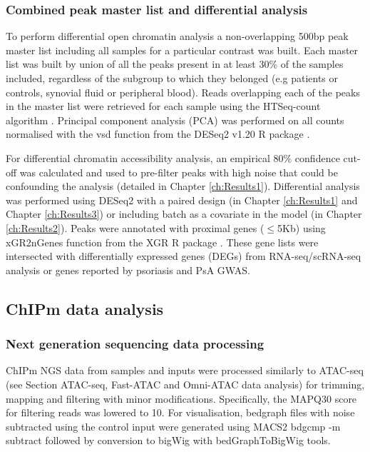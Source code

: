 \subsubsection{Combined peak master list and differential analysis}
To perform differential open chromatin analysis a non-overlapping 500bp peak master list including all samples for a particular contrast was built. Each master list was built by union of all the peaks present in at least 30\% of the samples included, regardless of the subgroup to which they belonged (e.g patients or controls, synovial fluid or peripheral blood).  Reads overlapping each of the peaks in the master list were retrieved for each sample using the HTSeq-count algorithm \parencite{Anders2015}. Principal component analysis (PCA) was performed on all counts normalised with the vsd function from the DESeq2 v1.20 R package \parencite{Love2014}.

For differential chromatin accessibility analysis, an empirical 80\% confidence cut-off was calculated and used to pre-filter peaks with high noise that could be confounding the analysis (detailed in Chapter \ref{ch:Results1}). Differential analysis was performed using DESeq2 with a paired design (in Chapter \ref{ch:Results1} and Chapter \ref{ch:Results3}) or including batch as a covariate in the model (in Chapter \ref{ch:Results2}). Peaks were annotated with proximal genes ($\leq$5Kb) using xGR2nGenes function from the XGR R package \parencite{Fang2016}. These gene lists were intersected with differentially expressed genes (DEGs) from RNA-seq/scRNA-seq analysis or genes reported by psoriasis and PsA GWAS.





\subsection{ChIPm data analysis}

\subsubsection{Next generation sequencing data processing}
ChIPm NGS data from samples and inputs were processed similarly to ATAC-seq (see Section ATAC-seq, Fast-ATAC and Omni-ATAC data analysis) for trimming, mapping and filtering with minor modifications. Specifically, the MAPQ30 score for filtering reads was lowered to 10. For visualisation, bedgraph files with noise subtracted using the control input were generated using MACS2 bdgcmp -m subtract followed by conversion to bigWig with bedGraphToBigWig tools.

